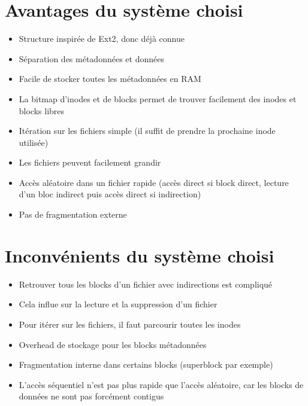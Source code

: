 \documentclass{article}
\begin{document}
\section{Avantages du système choisi}
\begin{itemize}
	\item Structure inspirée de Ext2, donc déjà connue
	\item Séparation des métadonnées et données
	\item Facile de stocker toutes les métadonnées en RAM
	\item La bitmap d'inodes et de blocks permet de trouver facilement des inodes et blocks libres
	\item Itération sur les fichiers simple (il suffit de prendre la prochaine inode utilisée)
	\item Les fichiers peuvent facilement grandir
	\item Accès aléatoire dans un fichier rapide (accès direct si block direct, lecture d'un bloc indirect puis accès direct si indirection)
	\item Pas de fragmentation externe
\end{itemize}
\section{Inconvénients du système choisi}
\begin{itemize}
	\item Retrouver tous les blocks d'un fichier avec indirections est compliqué
	\item Cela influe sur la lecture et la suppression d'un fichier
	\item Pour itérer sur les fichiers, il faut parcourir toutes les inodes
	\item Overhead de stockage pour les blocks métadonnées
	\item Fragmentation interne dans certains blocks (superblock par exemple)
	\item L'accès séquentiel n'est pas plus rapide que l'accès aléatoire, car les blocks de données ne sont pas forcément contigus
\end{itemize}
\end{document}
